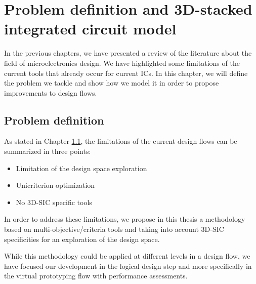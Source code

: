 \chapter{Problem definition and 3D-stacked integrated circuit model}
\label{chap5:model}

In the previous chapters, we have presented a review of the literature about the field of microelectronics design. We have highlighted some limitations of the current tools that already occur for current ICs. In this chapter, we will define the problem we tackle and show how we model it in order to propose improvements to design flows.

\section{Problem definition}
As stated in Chapter \ref{}, the limitations of the current design flows can be summarized in three points:
\begin{itemize}
\item Limitation of the design space exploration
\item Unicriterion optimization
\item No 3D-SIC specific tools
\end{itemize}
In order to address these limitations, we propose in this thesis a methodology based on multi-objective/criteria tools and taking into account 3D-SIC specificities for an exploration of the design space.

While this methodology could be applied at different levels in a design flow, we have focused our development in the logical design step and more specifically in the virtual prototyping flow with performance assessments.

